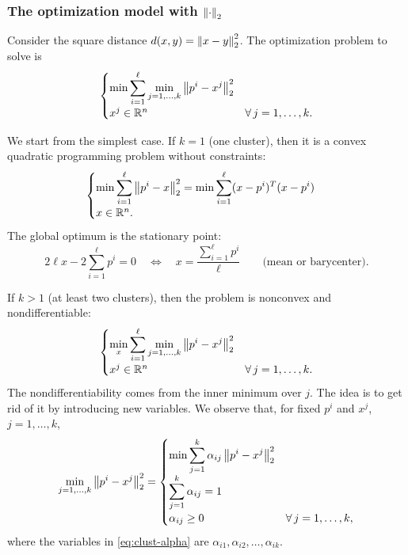 \subsubsection{The optimization model with \texorpdfstring{$\left\lVert \cdot \right\rVert_2$}{the 2-norm}}

Consider the square distance $d(x,y) = \left\lVert x-y \right\rVert_2^2$. The optimization problem to solve is
\[
\begin{cases}
\displaystyle \min \sum_{i=1}^{\ell} \min_{j=1,\dots,k} \left\lVert p^i - x^j \right\rVert_2^2\\[1ex]
x^j \in \mathbb{R}^n & \forall\, j=1,\dots,k.
\end{cases}
\]

We start from the simplest case. If $k=1$ (one cluster), then it is a convex quadratic programming problem without constraints:
\begin{equation}\label{eq:clust-one}
\begin{cases}
\displaystyle \min \sum_{i=1}^{\ell} \left\lVert p^i - x \right\rVert_2^2 = \min \sum_{i=1}^{\ell} (x-p^i)^T(x-p^i)\\[1ex]
x \in \mathbb{R}^n.
\end{cases}
\end{equation}
The global optimum is the stationary point:
\[
2\ell x - 2\sum_{i=1}^{\ell} p^i = 0 \quad\Longleftrightarrow\quad x = \frac{\sum_{i=1}^{\ell} p^i}{\ell} \qquad \text{(mean or barycenter)}.
\]

If $k>1$ (at least two clusters), then the problem is nonconvex and nondifferentiable:
\begin{equation}\label{eq:clust-nonconvex}
\begin{cases}
\displaystyle \min_{x} \sum_{i=1}^{\ell} \min_{j=1,\dots,k} \left\lVert p^i - x^j \right\rVert_2^2\\[1ex]
x^j \in \mathbb{R}^n & \forall\, j=1,\dots,k.
\end{cases}
\end{equation}
The nondifferentiability comes from the inner minimum over $j$. The idea is to get rid of it by introducing new variables. We observe that, for fixed $p^i$ and $x^j$, $j=1,\dots,k$,
\begin{equation}\label{eq:clust-alpha}
\min_{j=1,\dots,k} \left\lVert p^i - x^j \right\rVert_2^2 =
\begin{cases}
\displaystyle \min \sum_{j=1}^{k} \alpha_{ij}\left\lVert p^i - x^j \right\rVert_2^2\\[1ex]
\displaystyle \sum_{j=1}^{k} \alpha_{ij} = 1\\[1ex]
\alpha_{ij} \ge 0 & \forall\, j=1,\dots,k,
\end{cases}
\end{equation}
where the variables in \eqref{eq:clust-alpha} are $\alpha_{i1},\alpha_{i2},\dots,\alpha_{ik}$.

